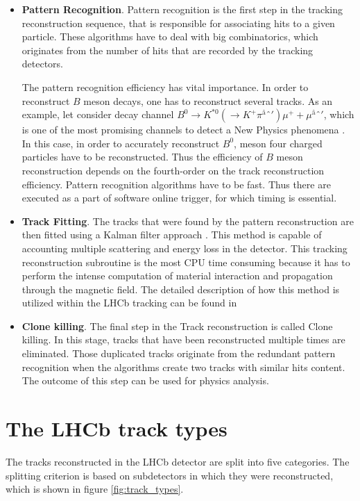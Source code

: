 \begin{itemize}
    \item \textbf{Pattern Recognition}. Pattern recognition is the first step in the tracking reconstruction sequence, that is responsible for associating hits to a given particle. These algorithms have to deal with big combinatorics, which originates from the number of hits that are recorded by the tracking detectors. 

    The pattern recognition efficiency has vital importance. In order to reconstruct $B$ meson decays, one has to reconstruct several tracks. As an example, let consider decay channel $B^0 \rightarrow K^{*0} (\rightarrow K^+\pi^â')\mu^+  + \mu^â' $, which is one of the most promising channels to detect a New Physics phenomena \cite{k*mumu}. In this case, in order to accurately reconstruct $B^0$, meson four charged particles have to be reconstructed. Thus the efficiency of $B$ meson reconstruction depends on the fourth-order on the track reconstruction efficiency. 
    Pattern recognition algorithms have to be fast. Thus there are executed as a part of software online trigger, for which timing is essential. 
\item \textbf{Track Fitting}. The tracks that were found by the pattern reconstruction are then fitted using a Kalman filter approach \cite{kalman}\cite{kalman2}. This method is capable of accounting multiple scattering and energy loss in the detector. This tracking reconstruction subroutine is the most CPU time consuming because it has to perform the intense computation of material interaction and propagation through the magnetic field. The detailed description of how this method is utilized within the LHCb tracking can  be found in   

\item \textbf{Clone killing}. The final step in the Track reconstruction is called Clone killing. In this stage, tracks that have been reconstructed multiple times are eliminated. Those duplicated tracks originate from the redundant pattern recognition when the algorithms create two tracks with similar hits content. The outcome of this step can be used for physics analysis.   
\end{itemize}



\section{The LHCb track types}
The tracks reconstructed in the LHCb detector are split into five categories. The splitting criterion is based on subdetectors in which they were reconstructed, which is shown in figure \ref{fig:track_types}. 


